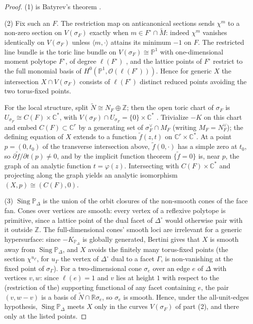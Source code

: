 \documentclass[11pt]{amsart}
\theoremstyle{definition}
\theoremstyle{remark}
\newcommand{\ZZ}{\mathbb{Z}}
\newcommand{\RR}{\mathbb{R}}
\newcommand{\CC}{\mathbb{C}}
\newcommand{\PP}{\mathbb{P}}
\newcommand{\Sing}{\operatorname{Sing}}
\begin{document}
\begin{proof}
(1) is Batyrev's theorem \cite[\S4]{Batyrev94}.

(2) Fix such an $F$.  The restriction map on anticanonical sections sends
$\chi^m$ to a non-zero section on $V(\sigma_F)$ exactly when
$m \in F^\circ \cap \widetilde M$: indeed $\chi^m$ vanishes identically on
$V(\sigma_F)$ unless $\langle m, \cdot \rangle$ attains its minimum $-1$ on
$F$.  The restricted line bundle is the toric line bundle on
$V(\sigma_F)\cong\PP^1$ with one-dimensional moment polytope $F^\circ$, of
degree $\ell(F^\circ)$ \cite[\S6.3]{CLS}, and the lattice points of $F^\circ$
restrict to the full monomial basis of $H^0(\PP^1,
\mathcal{O}(\ell(F^\circ)))$.  Hence for generic $X$ the intersection
$X \cap V(\sigma_F)$ consists of $\ell(F^\circ)$ distinct reduced points
avoiding the two torus-fixed points.

For the local structure, split $\widetilde N \cong N_F \oplus \ZZ$; then the
open toric chart of $\sigma_F$ is $U_{\sigma_F} \cong C(F) \times \CC^\ast$,
with $V(\sigma_F)\cap U_{\sigma_F} = \{0\} \times \CC^\ast$
\cite[Prop.~3.3.9]{CLS}.  Trivialize $-K$ on this chart and embed
$C(F) \subset \CC^r$ by a generating set of $\sigma_F^\vee \cap M_F$
(writing $M_F = N_F^\vee$); the
defining equation of $X$ extends to a function $\widetilde f(z, t)$ on
$\CC^r\times\CC^\ast$.  At a point $p=(0,t_0)$ of the transverse intersection
above, $\widetilde f(0, \cdot)$ has a simple zero at $t_0$, so
$\partial\widetilde f/\partial t (p) \neq 0$, and by the implicit function
theorem $\{\widetilde f = 0\}$ is, near $p$, the graph of an analytic function
$t = \varphi(z)$.  Intersecting with $C(F)\times\CC^\ast$ and projecting along
the graph yields an analytic isomorphism $(X, p) \cong (C(F), 0)$.

(3) $\Sing \PP_\Delta$ is the union of the orbit closures of the non-smooth
cones of the face fan.  Cones over vertices are smooth: every vertex
of a reflexive polytope is primitive, since a lattice point of the dual
facet of $\Delta^\circ$ would otherwise pair with it outside $\ZZ$.
The full-dimensional cones'
smooth loci are irrelevant for a generic hypersurface: since
$-K_{\PP_\Delta}$ is globally generated, Bertini gives that $X$ is smooth away
from $\Sing\PP_\Delta$, and $X$ avoids the finitely many torus-fixed points
(the section $\chi^{u_\Gamma}$, for $u_\Gamma$ the vertex of $\Delta^\circ$
dual to a facet $\Gamma$, is non-vanishing at the fixed point of
$\sigma_\Gamma$).  For a two-dimensional cone $\sigma_e$ over an edge $e$ of
$\Delta$ with vertices $v, w$: since $\ell(e)=1$ and $v$ lies at height $1$
with respect to the (restriction of the) supporting functional of any facet
containing $e$, the pair $(v, w-v)$ is a basis of $\widetilde N \cap
\RR\sigma_e$, so $\sigma_e$ is smooth.  Hence, under the all-unit-edges
hypothesis, $\Sing\PP_\Delta$ meets $X$ only in the curves $V(\sigma_F)$ of
part (2), and there only at the listed points.
\end{proof}
\end{document}
